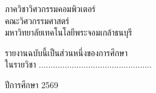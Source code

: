 \documentclass[conference]{IEEEtran}
\begin{document}
\begin{titlepage}
\begin{center}
{\large
ภาควิชาวิศวกรรมคอมพิวเตอร์\\
คณะวิศวกรรมศาสตร์\\
มหาวิทยาลัยเทคโนโลยีพระจอมเกล้าธนบุรี
}

\vspace{1cm}

{\large
รายงานฉบับนี้เป็นส่วนหนึ่งของการศึกษา\\
ในรายวิชา ................................................
}

\vspace{0.5cm}

{\large
ปีการศึกษา 2569
}

\end{center}

\end{titlepage}



\clearpage



\end{document}
